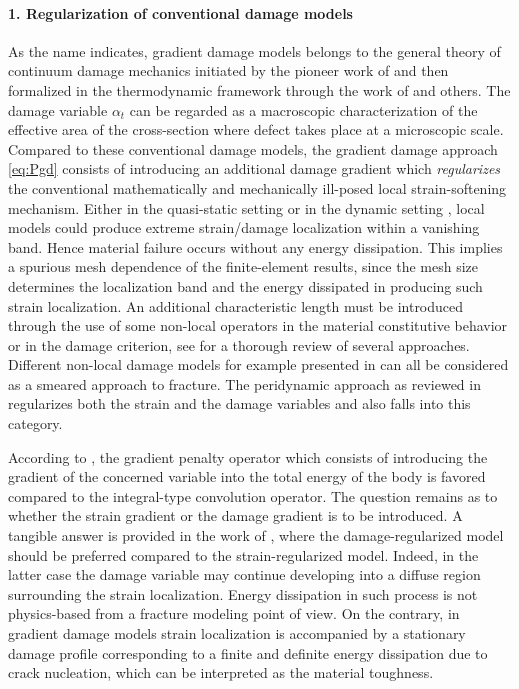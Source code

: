 \paragraph{1. Regularization of conventional damage models} As the name indicates, gradient damage models belongs to the general theory of continuum damage mechanics initiated by the pioneer work of \cite{Kachanov:1958} and then formalized in the thermodynamic framework through the work of \cite{LemaitreChaboche:1978} and others. The damage variable $\alpha_t$ can be regarded as a macroscopic characterization of the effective area of the cross-section where defect takes place at a microscopic scale. Compared to these conventional damage models, the gradient damage approach \eqref{eq:Pgd} consists of introducing an additional damage gradient which \emph{regularizes} the conventional mathematically and mechanically ill-posed local strain-softening mechanism. Either in the quasi-static setting \cite{Benallal:1993} or in the dynamic setting \cite{Bazant:1985aa}, local models could produce extreme strain/damage localization within a vanishing band. Hence material failure occurs without any energy dissipation. This implies a spurious mesh dependence of the finite-element results, since the mesh size determines the localization band and the energy dissipated in producing such strain localization. An additional characteristic length must be introduced through the use of some non-local operators in the material constitutive behavior or in the damage criterion, see \cite{VreeBrekelmansGils:1995,Jirasek:1998,Peerlings:2001aa,LorentzAndrieux:2003} for a thorough review of several approaches. Different non-local damage models for example presented in \cite{PeerlingsBorstBrekelmansVree:1996,PeerlingsBorstBrekelmansGeers:1998,Comi:1999,Comi:2001,Peerlings:2001aa,LorentzAndrieux:2003,BorstRemmersNeedlemanAbellan:2004} can all be considered as a smeared approach to fracture. The peridynamic approach as reviewed in \cite{Silling:2010aa} regularizes both the strain and the damage variables and also falls into this category.

According to \cite{LorentzAndrieux:2003}, the gradient penalty operator which consists of introducing the gradient of the concerned variable into the total energy of the body is favored compared to the integral-type convolution operator. The question remains as to whether the strain gradient \cite{PeerlingsBorstBrekelmansVree:1996} or the damage gradient \cite{LorentzBenallal:2005,PhamAmorMarigoMaurini:2011} is to be introduced. A tangible answer is provided in the work of \cite{LeMauriniMarigoVidoli:2015}, where the damage-regularized model should be preferred compared to the strain-regularized model. Indeed, in the latter case the damage variable may continue developing into a diffuse region surrounding the strain localization. Energy dissipation in such process is not physics-based from a fracture modeling point of view. On the contrary, in gradient damage models strain localization is accompanied by a stationary damage profile corresponding to a finite and definite energy dissipation due to crack nucleation, which can be interpreted as the material toughness.

